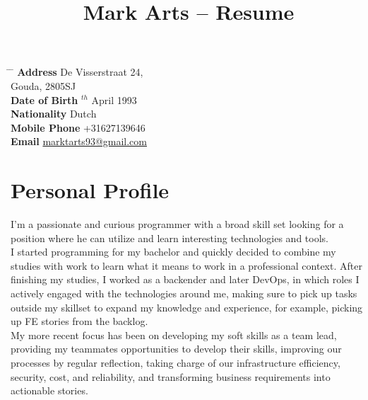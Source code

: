 \documentclass[10pt]{article} %
\begin{document}

\title{Mark Arts -- Resume} %


\parbox{0.5\textwidth}{ %
\begin{tabbing} %
\hspace{3cm} \= \hspace{4cm} \= \kill %
{\bf Address} \> De Visserstraat 24,\\ %
\> Gouda, 2805SJ \\ %
{\bf Date of Birth} $^{th}$ April 1993 \\ %
{\bf Nationality} \> Dutch \\%
{\bf Mobile Phone} \> +31627139646 \\ %
{\bf Email} \> \href{mailto:marktarts93@gmail.com}{marktarts93@gmail.com} \\ %
\end{tabbing}}


\section{Personal Profile}

I'm a passionate and curious programmer with a broad skill set looking for a position where he can utilize and learn interesting technologies and tools. \\

I started programming for my bachelor and quickly decided to combine my studies with work to learn what it means to work in a professional context. After finishing my studies, I worked as a backender and later DevOps, in which roles I actively engaged with the technologies around me, making sure to pick up tasks outside my skillset to expand my knowledge and experience, for example, picking up FE stories from the backlog. \\

My more recent focus has been on developing my soft skills as a team lead, providing my teammates opportunities to develop their skills, improving our processes by regular reflection, taking charge of our infrastructure efficiency, security, cost, and reliability, and transforming business requirements into actionable stories.
\end{document}
